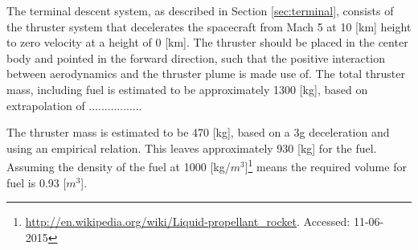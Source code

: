 The terminal descent system, as described in Section \ref{sec:terminal}, consists of the thruster system that decelerates the spacecraft from Mach 5 at 10 [km] height to zero velocity at a height of 0 [km]. The thruster should be placed in the center body and pointed in the forward direction, such that the positive interaction between aerodynamics and the thruster plume is made use of. The total thruster mass, including fuel is estimated to be approximately 1300 [kg], based on extrapolation of .................

The thruster mass is estimated to be 470 [kg], based on a 3g deceleration and using an empirical relation\cite{Christian2006}. This leaves approximately 930 [kg] for the fuel. Assuming the density of the fuel at 1000 [kg/$m^3$]\footnote{\url{http://en.wikipedia.org/wiki/Liquid-propellant_rocket}. Accessed: 11-06-2015} means the required volume for fuel is 0.93 [$m^3$].



